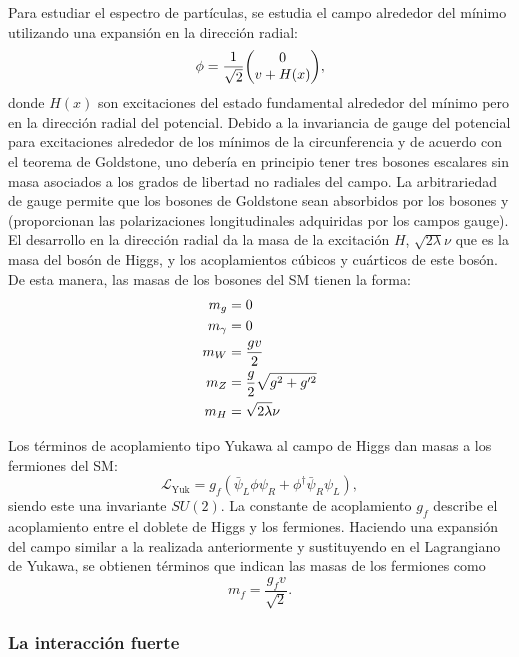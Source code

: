 Para estudiar el espectro de partículas, se estudia el campo alrededor del mínimo utilizando una expansión en la dirección radial:
\begin{equation}
    \phi = \frac{1}{\sqrt{2}} \mqty(0 \\ v + H(x)),
\end{equation}
donde \(H(x)\) son excitaciones del estado fundamental alrededor del mínimo pero en la dirección radial del potencial.
Debido a la invariancia de gauge del potencial para excitaciones alrededor de los mínimos de la circunferencia y de acuerdo con el teorema de Goldstone, uno debería en principio tener tres bosones escalares sin masa asociados a los grados de libertad no radiales del campo. La arbitrariedad de gauge permite que los bosones de Goldstone sean absorbidos por los bosones \Wboson y \Zboson (proporcionan las polarizaciones longitudinales adquiridas por los campos gauge). El desarrollo en la dirección radial da la masa de la excitación \(H\), \(\sqrt{2\lambda}\nu\) que es la masa del bosón de Higgs, y los acoplamientos cúbicos y cuárticos de este bosón. De esta manera, las masas de los bosones del \ac{SM} tienen la forma:
\begin{align}
    m_{g} &= 0\\
    m_{\gamma} &= 0\\
    m_{W} & = \frac{g v}{2}\\
    m_{Z} & = \frac{g}{2} \sqrt{g^2 + g'^2}\\
    m_{H} & = \sqrt{2\lambda}\nu
\end{align}

Los términos de acoplamiento tipo Yukawa al campo de Higgs dan masas a los fermiones del \ac{SM}:
\begin{equation}
    \mathcal{L}_{\text{Yuk}} = g_f \left(\bar{\psi}_L \phi \psi_R + \phi^{\dagger} \bar{\psi}_R \psi_L\right),
\end{equation}
siendo este una invariante \(SU(2)\). La constante de acoplamiento \(g_f\) describe el acoplamiento entre el doblete de Higgs y los fermiones. Haciendo una expansión del campo similar a la realizada anteriormente y sustituyendo en el Lagrangiano de Yukawa, se obtienen términos que indican las masas de los fermiones como
\begin{equation}
    m_f = \frac{g_f v}{\sqrt{2}}.
\end{equation}


\subsubsection{La interacción fuerte}
\label{subsubsec:theory:sm:mathematical:qcd}

